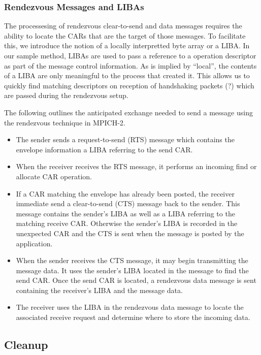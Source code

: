 \documentclass[11pt,letterpaper]{article}
\begin{document}
%
%
\subsubsection{Rendezvous Messages and LIBAs}

The processesing of rendezvous clear-to-send and data messages requires the
ability to locate the CARs that are the target of those messages.  To
facilitate this, we introduce the notion of a locally interpretted byte array
or a LIBA.  In our sample method, LIBAs are used to pass a reference to a
operation descriptor as part of the message control information.  As is implied
by ``local'', the contents of a LIBA are only meaningful to the process that
created it.  This allows us to quickly find matching descriptors on reception
of handshaking packets (?) which are passed during the rendezvous setup.

The following outlines the anticipated exchange needed to send a message using
the rendezvous technique in MPICH-2.
\begin{itemize}
\item The sender sends a request-to-send (RTS) message which contains the
  envelope information a LIBA referring to the send CAR.
\item When the receiver receives the RTS message, it performs an incoming find
  or allocate CAR operation.
\item If a CAR matching the envelope has already been posted, the receiver
  immediate send a clear-to-send (CTS) message back to the sender.  This
  message contains the sender's LIBA as well as a LIBA referring to the
  matching receive CAR.  Otherwise the sender's LIBA is recorded in the
  unexpected CAR and the CTS is sent when the message is posted by the
  application.
\item When the sender receives the CTS message, it may begin transmitting the
  message data.  It uses the sender's LIBA located in the message to find the
  send CAR.  Once the send CAR is located, a rendezvous data message is sent
  containing the receiver's LIBA and the message data.
\item The receiver uses the LIBA in the rendezvous data message to locate the
  associated receive request and determine where to store the incoming data.
\end{itemize}



\subsection{Cleanup}
\end{document}
